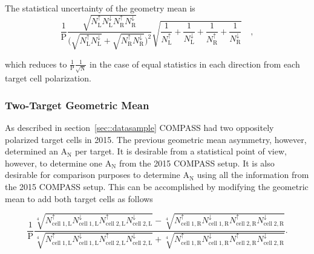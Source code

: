 The statistical uncertainty of the geometry mean is
\begin{equation}
  \frac{1}{\mathrm{P}}
  \frac{
    \sqrt{
      N_{\mathrm{L}}^{\uparrow}N_{\mathrm{L}}^{\downarrow}
      N_{\mathrm{ R}}^{\uparrow}N_{\mathrm{R}}^{\downarrow}
    }
  }{
    \Big( \sqrt{N_{\mathrm{L}}^{\uparrow}N_{\mathrm{L}}^{\downarrow}} +
    \sqrt{N_{\mathrm{R}}^{\uparrow}N_{\mathrm{R}}^{\downarrow}} \Big)^2
  }
  \sqrt{
    \frac{1}{N_{\mathrm{L}}^{\uparrow}} +
    \frac{1}{N_{\mathrm{L}}^{\downarrow}} +
    \frac{1}{N_{\mathrm{R}}^{\uparrow}} +
    \frac{1}{N_{\mathrm{R}}^{\downarrow}}
  } \quad,
\end{equation}

\noindent
which reduces to $\frac{1}{\mathrm{P}}\frac{1}{\sqrt{\mathrm{N}}}$ in the case
of equal statistics in each direction from each target cell polarization.

\subsubsection{Two-Target Geometric Mean} \label{sec::TwoTargGeoMean}
As described in section~\ref{sec::datasample} COMPASS had two oppositely
polarized target cells in 2015.  The previous geometric mean asymmetry, however,
determined an A$_{\mathrm{N}}$ per target.  It is desirable from a statistical
point of view, however, to determine one A$_{\mathrm{N}}$ from the 2015 COMPASS
setup.  It is also desirable for comparison purposes to determine
A$_{\mathrm{N}}$ using all the information from the 2015 COMPASS setup.  This
can be accomplished by modifying the geometric mean to add both target cells as
follows

\begin{equation}
  \label{equ::AN4TargGeomean}
  \frac{1}{\mathrm{P}}
  \frac{
    \sqrt[4]{
      N_{\mathrm{cell\;1,L}}^{\uparrow}N_{\mathrm{cell\;1, L}}^{\downarrow}
      N_{\mathrm{cell\;2,L}}^{\uparrow}N_{\mathrm{cell\;2, L}}^{\downarrow}
    } -
    \sqrt[4]{
      N_{\mathrm{cell\;1,R}}^{\uparrow}N_{\mathrm{cell\;1, R}}^{\downarrow}
      N_{\mathrm{cell\;2,R}}^{\uparrow}N_{\mathrm{cell\;2, R}}^{\downarrow}
    }
  }{
    \sqrt[4]{
      N_{\mathrm{cell\;1,L}}^{\uparrow}N_{\mathrm{cell\;1, L}}^{\downarrow}
      N_{\mathrm{cell\;2,L}}^{\uparrow}N_{\mathrm{cell\;2, L}}^{\downarrow}
    } +
    \sqrt[4]{
      N_{\mathrm{cell\;1,R}}^{\uparrow}N_{\mathrm{cell\;1, R}}^{\downarrow}
      N_{\mathrm{cell\;2,R}}^{\uparrow}N_{\mathrm{cell\;2, R}}^{\downarrow}
    }
  }.
\end{equation}

